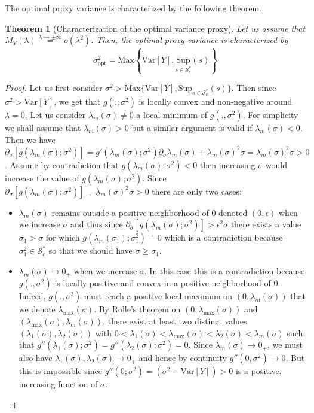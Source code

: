 \documentclass[a4paper, 10pt]{article}
\newcommand{\beq}{\begin{equation}}
\newcommand{\eeq}{\end{equation}}
\newtheorem{theorem}{Theorem}[section]
\theoremstyle{definition}
\begin{document}
The optimal proxy variance is characterized by the following theorem.

\begin{theorem}[Characterization of the optimal variance proxy]\label{GeneralCharac} Let us assume that $M_Y(\lambda)\overset{\lambda\to \pm\infty}{=}o(\lambda^2)$. Then, the optimal proxy variance is characterized by
\beq \sigma_{\text{opt}}^2=\text{Max}\left\{\text{Var}[Y],\underset{s\in \mathcal{S}_c^*}{\text{Sup}}(s)\right\}\eeq    
\end{theorem}

\begin{proof}Let us first consider $\sigma^2>\text{Max}\{\text{Var}[Y],\text{Sup}_{s\in \mathcal{S}_c^*}(s)\}$. Then since $\sigma^2>\text{Var}[Y]$, we get that $g(.;\sigma^2)$ is locally convex and non-negative around $\lambda=0$.  Let us consider $\lambda_m(\sigma)\neq 0$ a local minimum of $g(.,\sigma^2)$. For simplicity we shall assume that $\lambda_m(\sigma)>0$ but a similar argument is valid if $\lambda_m(\sigma)<0$. Then we have $\partial_{\sigma}[g(\lambda_m(\sigma);\sigma^2)]= g'(\lambda_m(\sigma);\sigma^2) \partial_\sigma \lambda_m(\sigma) + \lambda_m(\sigma)^2\sigma= \lambda_m(\sigma)^2\sigma>0$. Assume by contradiction that $g(\lambda_m(\sigma);\sigma^2)<0$ then increasing $\sigma$ would increase the value of $g(\lambda_m(\sigma);\sigma^2)$. Since $\partial_{\sigma}[g(\lambda_m(\sigma);\sigma^2)]=\lambda_m(\sigma)^2\sigma>0$ there are only two cases: \begin{itemize}\item $\lambda_m(\sigma)$ remains outside a positive neighborhood of $0$ denoted $(0,\epsilon)$ when we increase $\sigma$ and thus since $\partial_{\sigma}[g(\lambda_m(\sigma);\sigma^2)]>\epsilon^2 \sigma$ there exists a value $\sigma_1>\sigma$ for which $g(\lambda_m(\sigma_1);\sigma_1^2)=0$ which is a contradiction because $\sigma_1^2\in \mathcal{S}_c^*$ so that we should have $\sigma\geq \sigma_1$.
\item $\lambda_m(\sigma)\to 0_+$ when we increase $\sigma$. In this case this is a contradiction because $g(.,\sigma^2)$ is locally positive and convex in a positive neighborhood of $0$. Indeed, $g(.,\sigma^2)$ must reach a positive local maximum on $(0,\lambda_m(\sigma))$ that we denote $\lambda_{\text{max}}(\sigma)$. By Rolle's theorem on $(0,\lambda_{\text{max}}(\sigma))$ and $(\lambda_{\text{max}}(\sigma),\lambda_m(\sigma))$, there exist at least two distinct values $(\lambda_1(\sigma),\lambda_2(\sigma))$ with $0<\lambda_1(\sigma)<\lambda_{\text{max}}(\sigma)<\lambda_2(\sigma)<\lambda_m(\sigma)$ such that $g''(\lambda_1(\sigma);\sigma^2)=g''(\lambda_2(\sigma);\sigma^2)=0$. Since $\lambda_m(\sigma)\to 0_+$, we must also have $\lambda_1(\sigma),\lambda_2(\sigma)\to 0_+$ and hence by continuity $g''(0,\sigma^2)\to 0$. But this is impossible since $g''(0;\sigma^2)=(\sigma^2-\text{Var}[Y])>0$ is a positive, increasing function of $\sigma$. 

\end{itemize}
\end{proof}
\end{document}
